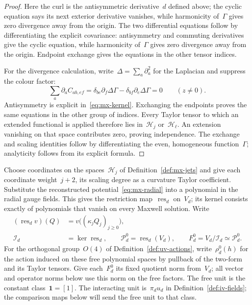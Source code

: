 \begin{proof}
Here the curl is the antisymmetric derivative~$d$ defined above; the cyclic equation says its next exterior derivative vanishes, while harmonicity of~$\Gamma$ gives zero divergence away from the origin.
The two differential equations follow by differentiating the explicit covariance: antisymmetry and commuting derivatives give the cyclic equation, while harmonicity of~$\Gamma$ gives zero divergence away from the origin. Endpoint exchange gives the equations in the other tensor indices.

For the divergence calculation, write~$\Delta=\sum_a\partial_a^2$ for the Laplacian and suppress the colour factor:
\begin{equation*}
 \sum_a\partial_a C_{ab,ef}
 =\delta_{be}\partial_f\Delta\Gamma-\delta_{bf}\partial_e\Delta\Gamma=0
 \qquad(z\ne0).
\end{equation*}
Antisymmetry is explicit in~\eqref{eq:mx-kernel}.
Exchanging the endpoints proves the same equations in the other group of indices.
Every Taylor tensor to which an extended functional is applied therefore lies in~$\mathcal H_j$ or~$\mathcal H_\ell$.
An extension vanishing on that space contributes zero, proving independence.
The exchange and scaling identities follow by differentiating the even, homogeneous function~$\Gamma$; analyticity follows from its explicit formula.
\end{proof}

\begin{definition}\label{def:mx-fields}
Choose coordinates on the spaces~$\mathcal H_j$ of Definition~\ref{def:mx-jets} and give each coordinate weight~$j+2$, its scaling degree as a curvature Taylor coefficient.
Substitute the reconstructed potential~\eqref{eq:mx-radial} into a polynomial in the radial gauge fields. This gives the restriction map~$\operatorname{res}_d$ on~$V_d$; its kernel consists exactly of polynomials that vanish on every Maxwell solution.
Write
\begin{equation}\label{eq:mx-polynomials}
\begin{aligned}
 (\operatorname{res}_d v)(Q)&=v\bigl((\kappa_jQ_j)_{j\ge0}\bigr),\\
 \mathcal I_d&=\ker\operatorname{res}_d,\qquad
 \mathcal P_d^0=\operatorname{res}_d(V_d),\qquad
 F_d^0=V_d/\mathcal I_d\simeq\mathcal P_d^0.
\end{aligned}
\end{equation}
For the orthogonal group~$O(4)$ of Definition~\ref{def:uv-actions}, write~$\rho_d^0(h)$ for the action induced on these free polynomial spaces by pullback of the two-form and its Taylor tensors.
Give each~$F_d^0$ its fixed quotient norm from~$V_d$; all vector and operator norms below use this norm on the free factors.
The free unit is the constant class~$\mathbf1=[1]$.
The interacting unit is~$\pi_du_d$ in Definition~\ref{def:iv-fields}; the comparison maps below will send the free unit to that class.
\end{definition}

